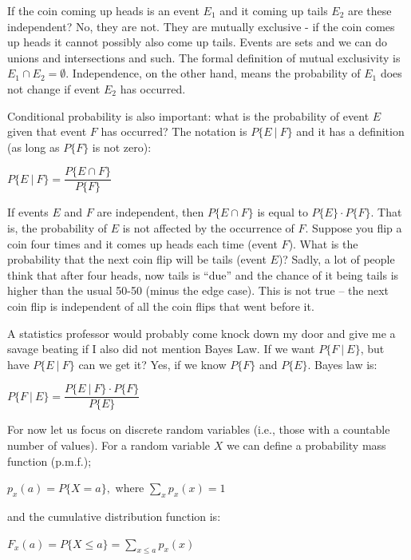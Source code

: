 If the coin coming up heads is an event $E_{1}$ and it coming up tails $E_{2}$ are these independent? No, they are not. They are mutually exclusive - if the coin comes up heads it cannot possibly also come up tails. Events are sets and we can do unions and intersections and such. The formal definition of mutual exclusivity is $E_{1} \cap E_{2} = \emptyset$. Independence, on the other hand, means the probability of $E_{1}$ does not change if event $E_{2}$ has occurred.

Conditional probability is also important: what is the probability of event $E$ given that event $F$ has occurred? The notation is $P\{ E~|~F \}$ and it has a definition (as long as $P\{F\}$ is not zero): 

\begin{center}
	$P\{E~|~F\} = \dfrac{P\{E \cap F\}}{P\{F\}}$
\end{center}

If events $E$ and $F$ are independent, then $P\{E \cap F\}$ is equal to $P\{E\} \cdot P\{F\}$. That is, the probability of $E$ is not affected by the occurrence of $F$. Suppose you flip a coin four times and it comes up heads each time (event $F$). What is the probability that the next coin flip will be tails (event $E$)? Sadly, a lot of people think that after four heads, now tails is ``due'' and the chance of it being tails is higher than the usual 50-50 (minus the edge case). This is not true -- the next coin flip is independent of all the coin flips that went before it.

A statistics professor would probably come knock down my door and give me a savage beating if I also did not mention Bayes Law. If we want $P\{ F~|~E \}$, but have $P\{ E~|~F \}$ can we get it? Yes, if we know $P\{F\}$ and $P\{E\}$. Bayes law is:

\begin{center}
	$P\{F~|~E\} = \dfrac{P\{E~|~F\} \cdot P\{F\}}{P\{E\}}$
\end{center}

For now let us focus on discrete random variables (i.e., those with a countable number of values). For a random variable $X$ we can define a probability mass function (p.m.f.);

\begin{center}
	$p_{x}(a) = P \{ X = a \},$ where $\sum\limits_{x}^{~} p_{x}(x) = 1$
\end{center}
	and the cumulative distribution function is:
\begin{center}
	$F_{x}(a) = P \{ X \leq a \} = \sum\limits_{x \leq a} p_{x}(x)$
\end{center}

